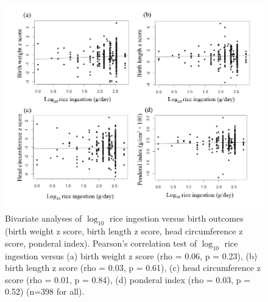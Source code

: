 \begin{figure}
  \centering
    \label{fig:Fig332}
  \includegraphics[scale=1]{Figures/Fig332.pdf}
  \caption[Bivariate analyses of $\log_{10}$ rice ingestion versus birth outcomes (birth weight z score, birth length z score, head circumference z score, ponderal index)]{Bivariate analyses of $\log_{10}$ rice ingestion versus birth outcomes (birth weight z score, birth length z score, head circumference z score, ponderal index). Pearson's correlation test of $\log_{10}$ rice ingestion versus (a) birth weight z score (rho = 0.06, p = 0.23), (b) birth length z score (rho = 0.03, p = 0.61), (c) head circumference z score (rho = 0.01, p = 0.84), (d) ponderal index (rho = 0.03, p = 0.52) (n=398 for all).}
\end{figure}

